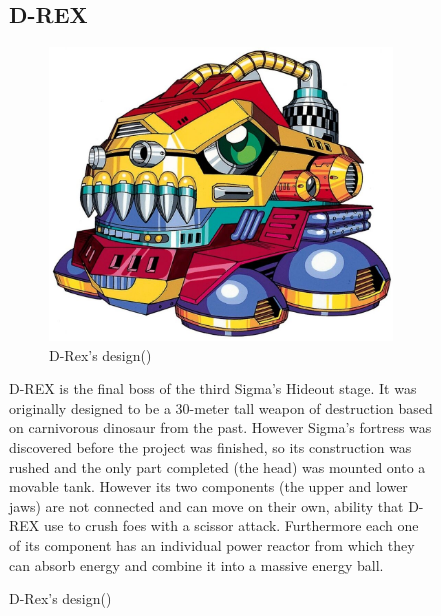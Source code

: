 \begin{figure}[htp]
\subsection{D-REX}
\begin{figure}[htp]
	\centering
	\includegraphics[width=0.4\linewidth]{figures/X1/Sigma_stages/Drex.jpg}
	\caption{D-Rex's design(\cite{book:MMX_Complete_art})}
\end{figure}

D-REX is the final boss of the third Sigma's Hideout stage. It was originally designed to be a 30-meter tall weapon of destruction based on carnivorous dinosaur from the past. However Sigma's fortress was discovered before the project was finished, so its construction was rushed and the only part completed (the head) was mounted onto a movable tank. However its two components (the upper and lower jaws) are not connected and can move on their own, ability that D-REX use to crush foes with a scissor attack. Furthermore each one of its component has an individual power reactor from which they can absorb energy and combine it into a massive energy ball\cite{wayback:X_resources}.


\end{figure}
